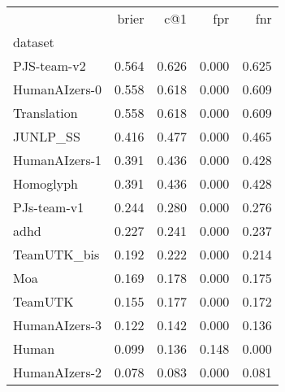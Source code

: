 \begin{tabular}{lrrrr}
\toprule
 & brier & c@1 & fpr & fnr \\
dataset &  &  &  &  \\
\midrule
PJS-team-v2 & 0.564 & 0.626 & 0.000 & 0.625 \\
HumanAIzers-0 & 0.558 & 0.618 & 0.000 & 0.609 \\
Translation & 0.558 & 0.618 & 0.000 & 0.609 \\
JUNLP_SS & 0.416 & 0.477 & 0.000 & 0.465 \\
HumanAIzers-1 & 0.391 & 0.436 & 0.000 & 0.428 \\
Homoglyph & 0.391 & 0.436 & 0.000 & 0.428 \\
PJs-team-v1 & 0.244 & 0.280 & 0.000 & 0.276 \\
adhd & 0.227 & 0.241 & 0.000 & 0.237 \\
TeamUTK_bis & 0.192 & 0.222 & 0.000 & 0.214 \\
Moa & 0.169 & 0.178 & 0.000 & 0.175 \\
TeamUTK & 0.155 & 0.177 & 0.000 & 0.172 \\
HumanAIzers-3 & 0.122 & 0.142 & 0.000 & 0.136 \\
Human & 0.099 & 0.136 & 0.148 & 0.000 \\
HumanAIzers-2 & 0.078 & 0.083 & 0.000 & 0.081 \\
\bottomrule
\end{tabular}
